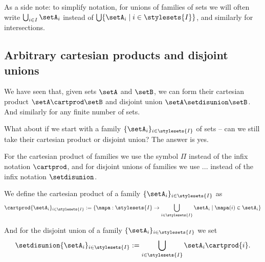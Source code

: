 

As a side note: to simplify notation, for unions of families of sets we will often write $\bigcup_{i \in I} \setA_i $ instead of $\bigcup \{  \setA_i \mid i \in \stylesets{I} \}$, and similarly for intersections. 

\subsection{Arbitrary cartesian products and disjoint unions}

We have seen that, given sets $\setA$ and $\setB$, we can form their cartesian product $\setA \cartprod \setB$ and disjoint union $\setA \setdisunion \setB$. And similarly for any finite number of sets. 

What about if we start with a family $\{ \setA_i \}_{i \in \stylesets{I}}$ of sets -- can we still take their cartesian product or disjoint union? 
The answer is yes. 

For the cartesian product of families we use the symbol $\Pi$ instead of the infix notation $\cartprod$, and for disjoint unions of families we use $...$ instead of the infix notation $\setdisunion$. 

We define the cartesian product of a family $\{ \setA_i \}_{i \in \stylesets{I}}$ as
\begin{equation}
\cartprod \{ \setA_i \}_{i \in \stylesets{I}} := \{ \mapa : \stylesets{I} \to \bigcup_{i \in \stylesets{I} } \setA_i \mid \mapa(i) \in \setA_i \}
\end{equation}


And for the disjoint union of a family $\{ \setA_i \}_{i \in \stylesets{I}}$ we set 
\begin{equation}
\setdisunion \{ \setA_i \}_{i \in \stylesets{I}} := \bigcup_{i \in \stylesets{I}} \setA_i \cartprod \{ i \}.
\end{equation}






